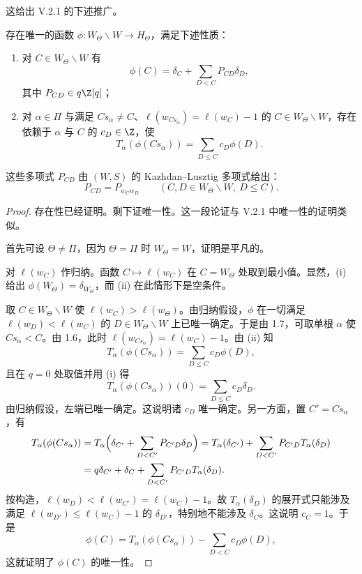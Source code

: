 这给出 V.2.1 的下述推广。

\begin{theorem}\label{thm:06.3.5}
存在唯一的函数 $\phi:W_\Theta\backslash W\to H_\Theta$，满足下述性质：
\begin{enumerate}[label=(\roman*)]
\item 对 $C\in W_\Theta\backslash W$ 有
$$\phi(C)=\delta_C+\sum_{D<C}P_{CD}\delta_D,$$
其中 $P_{CD}\in q\Z[q]$；
\item 对 $\alpha\in\Pi$ 与满足 $Cs_\alpha\neq C$、$\ell(w_{Cs_\alpha})=\ell(w_C)-1$ 的 $C\in W_\Theta\backslash W$，存在依赖于 $\alpha$ 与 $C$ 的 $c_D\in\Z$，使
$$T_\alpha(\phi(Cs_\alpha))=\sum_{D\le C}c_D\phi(D).$$
\end{enumerate}
这些多项式 $P_{CD}$ 由 $(W,S)$ 的 Kazhdan--Lusztig 多项式给出：
$$P_{CD}=P_{w_Cw_D}\qquad(C,D\in W_\Theta\backslash W,\ D\le C).$$
\end{theorem}

\begin{proof}
存在性已经证明。剩下证唯一性。这一段论证与 V.2.1 中唯一性的证明类似。

首先可设 $\Theta\neq\Pi$，因为 $\Theta=\Pi$ 时 $W_\Theta=W$，证明是平凡的。

对 $\ell(w_C)$ 作归纳。函数 $C\mapsto\ell(w_C)$ 在 $C=W_\Theta$ 处取到最小值。显然，(i) 给出 $\phi(W_\Theta)=\delta_{W_\Theta}$，而 (ii) 在此情形下是空条件。

取 $C\in W_\Theta\backslash W$ 使 $\ell(w_C)>\ell(w_\Theta)$。由归纳假设，$\phi$ 在一切满足 $\ell(w_D)<\ell(w_C)$ 的 $D\in W_\Theta\backslash W$ 上已唯一确定。于是由 1.7，可取单根 $\alpha$ 使 $Cs_\alpha<C$。由 1.6，此时 $\ell(w_{Cs_\alpha})=\ell(w_C)-1$。由 (ii) 知
$$T_\alpha(\phi(Cs_\alpha))=\sum_{D\le C}c_D\phi(D),$$
且在 $q=0$ 处取值并用 (i) 得
$$T_\alpha(\phi(Cs_\alpha))(0)=\sum_{D\le C}c_D\delta_D.$$
由归纳假设，左端已唯一确定。这说明诸 $c_D$ 唯一确定。另一方面，置 $C'=Cs_\alpha$，有
{\small
\begin{align*}
T_\alpha(\phi(Cs_\alpha))&=T_\alpha\Bigl(\delta_{C'}+\sum_{D<C'}P_{C'D}\delta_D\Bigr)
=T_\alpha(\delta_{C'})+\sum_{D<C'}P_{C'D}T_\alpha(\delta_D)\\
&=q\delta_{C'}+\delta_C+\sum_{D<C'}P_{C'D}T_\alpha(\delta_D).
\end{align*}
}
按构造，$\ell(w_D)<\ell(w_{C'})=\ell(w_C)-1$。故 $T_\alpha(\delta_D)$ 的展开式只能涉及满足 $\ell(w_{D'})\le\ell(w_C)-1$ 的 $\delta_{D'}$，特别地不能涉及 $\delta_C$。这说明 $c_C=1$。于是
$$\phi(C)=T_\alpha(\phi(Cs_\alpha))-\sum_{D<C}c_D\phi(D),$$
这就证明了 $\phi(C)$ 的唯一性。
\end{proof}

